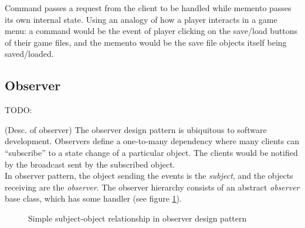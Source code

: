 \documentclass[10pt,letterpaper]{article}
\newcommand{\bs}{\bigskip}
\begin{document}
\begin{multicols}{2}
Command passes a request from the client to be handled while memento passes its own internal state. Using an analogy of how a player interacts in a game menu: a command would be the event of player clicking on the save/load buttons of their game files, and the memento would be the save file objects itself being saved/loaded.\bs
\\

\subsection{Observer}
TODO:

(Desc. of observer)
The observer design pattern is ubiquitous to software development. Observers define a one-to-many dependency where many clients can ``subscribe'' to a state change of a particular object. The clients would be notified by the broadcast sent by the subscribed object.\bs
\\
In observer pattern, the object sending the events is the \textit{subject}, and the objects receiving are the \textit{observer}. The observer hierarchy consists of an abstract \textit{observer} base class, which has some handler (see figure \ref{fig:observer-simple}).

\begin{figure}[H]
	\centering


	\caption{Simple subject-object relationship in observer design pattern}
	\label{fig:observer-simple}
\end{figure}


\end{multicols}
\end{document}
